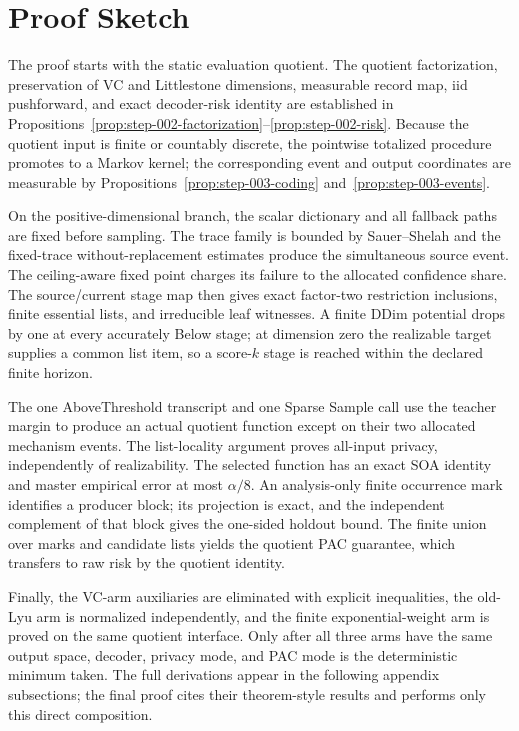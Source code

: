 \section{Proof Sketch}

The proof starts with the static evaluation quotient.  The quotient
factorization, preservation of VC and Littlestone dimensions, measurable
record map, iid pushforward, and exact decoder-risk identity are established
in Propositions~\ref{prop:step-002-factorization}--\ref{prop:step-002-risk}.
Because the quotient input is finite or countably discrete, the pointwise
totalized procedure promotes to a Markov kernel; the corresponding event and
output coordinates are measurable by Propositions~\ref{prop:step-003-coding}
and~\ref{prop:step-003-events}.

On the positive-dimensional branch, the scalar dictionary and all fallback
paths are fixed before sampling.  The trace family is bounded by Sauer--Shelah
and the fixed-trace without-replacement estimates produce the simultaneous
source event.  The ceiling-aware fixed point charges its failure to the
allocated confidence share.  The source/current stage map then gives exact
factor-two restriction inclusions, finite essential lists, and irreducible
leaf witnesses.  A finite DDim potential drops by one at every accurately
Below stage; at dimension zero the realizable target supplies a common list
item, so a score-$k$ stage is reached within the declared finite horizon.

The one AboveThreshold transcript and one Sparse Sample call use the teacher
margin to produce an actual quotient function except on their two allocated
mechanism events.  The list-locality argument proves all-input privacy,
independently of realizability.  The selected function has an exact SOA
identity and master empirical error at most $\alpha/8$.  An analysis-only
finite occurrence mark identifies a producer block; its projection is exact,
and the independent complement of that block gives the one-sided holdout
bound.  The finite union over marks and candidate lists yields the quotient
PAC guarantee, which transfers to raw risk by the quotient identity.

Finally, the VC-arm auxiliaries are eliminated with explicit inequalities,
the old-Lyu arm is normalized independently, and the finite exponential-weight
arm is proved on the same quotient interface.  Only after all three arms have
the same output space, decoder, privacy mode, and PAC mode is the deterministic
minimum taken.  The full derivations appear in the following appendix
subsections; the final proof cites their theorem-style results and performs
only this direct composition.

